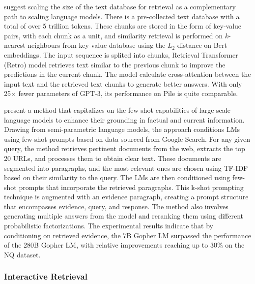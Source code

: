 \citet{borgeaud2022improving} suggest scaling the size of the text database for retrieval as a complementary path to scaling language models. There is a pre-collected text database with a total of over 5 trillion tokens. These chunks are stored in the form of key-value pairs, with each chunk as a unit, and similarity retrieval is performed on  $k$-nearest neighbours from key-value database using the $L_2$ distance on Bert embeddings. The input sequence is splited into chunks, Retrieval Transformer (Retro) model retrieves text similar to the previous chunk to improve the predictions in the current chunk. The model calculate cross-attention between the input text and the retrieved text chunks to generate better answers. With only 25× fewer parameters of GPT-3, its performance on Pile is quite comparable. 

\citet{lazaridou2022internetaugmented} present a method that capitalizes on the few-shot capabilities of large-scale language models to enhance their grounding in factual and current information. Drawing from semi-parametric language models, the approach conditions LMs using few-shot prompts based on data sourced from Google Search. For any given query, the method retrieves pertinent documents from the web, extracts the top 20 URLs, and processes them to obtain clear text. These documents are segmented into paragraphs, and the most relevant ones are chosen using TF-IDF based on their similarity to the query. The LMs are then conditioned using few-shot prompts that incorporate the retrieved paragraphs. This k-shot prompting technique is augmented with an evidence paragraph, creating a prompt structure that encompasses evidence, query, and response. The method also involves generating multiple answers from the model and reranking them using different probabilistic factorizations. The experimental results indicate that by conditioning on retrieved evidence, the 7B Gopher LM \citep{Gopher} surpassed the performance of the 280B Gopher LM, with relative improvements reaching up to 30\% on the NQ \citep{NQ} dataset.





\subsubsection{Interactive Retrieval}
\label{sec:enhace_rag_inter}

